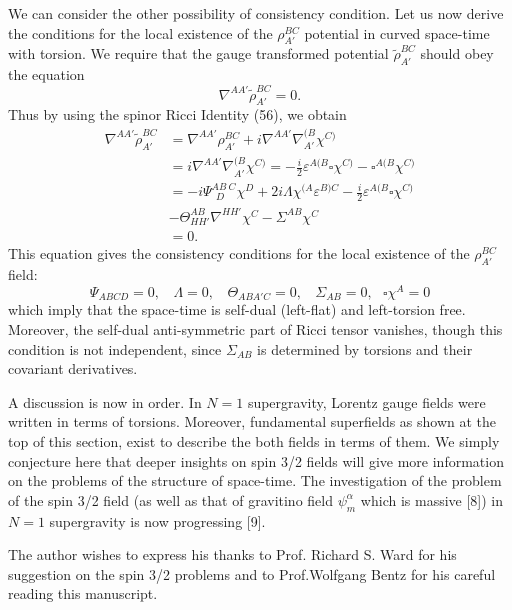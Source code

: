 \documentclass[a4paper,12pt]{article}
\begin{document}
We can consider the other possibility of consistency condition.
Let us now derive the conditions for the local existence of the $\rho_{A'}^{BC}$ potential in curved space-time with torsion. We require that the gauge transformed potential $\tilde\rho_{A'}^{BC}$ should obey the equation
\begin{equation}
\nabla^{AA'}\tilde\rho_{A'}^{BC}=0.
\end{equation}
Thus by using the spinor Ricci Identity (56), we obtain
\begin{equation}
\begin{split}
\nabla^{AA'}\tilde\rho_{A'}^{BC}&=\nabla^{AA'}\rho^{BC}_{A'}+i\nabla^{AA'}\nabla^{(B}_{A'}\chi^{C)}\\
&=i\nabla^{AA'}\nabla^{(B}_{A'}\chi^{C)}=-\frac{i}{2}\varepsilon^{A(B}\square\chi^{C)}-\square^{A(B}\chi^{C)}\\
&=-i\Psi^{AB\ C}_{\ \ D}\chi^D+2i\Lambda\chi^{(A}\varepsilon^{B)C}-\frac{i}{2}\varepsilon^{A(B}\square\chi^{C)}\\
&-\Theta^{AB}_{HH'}\nabla^{HH'}\chi^C-\Sigma^{AB}\chi^C\\
&=0.
\end{split}
\end{equation}
This equation gives the consistency conditions for the local existence of the $\rho_{A'}^{BC}$ field:
\begin{equation}
\Psi_{ABCD}=0,\ \ \ \ \Lambda=0,\ \ \ \ \Theta_{ABA'C}=0,\ \ \ \ \Sigma_{AB}=0,\ \ \ \square\chi^{A}=0
\end{equation}
which imply that the space-time is self-dual (left-flat) and left-torsion free. Moreover, the self-dual anti-symmetric part of Ricci tensor vanishes, though this condition is not independent, since $\Sigma_{AB}$ is determined by torsions and 
their covariant derivatives.

A discussion is now in order. In $N=1$ supergravity, Lorentz gauge fields were written in terms of torsions. Moreover, fundamental superfields as shown at the top of this section, exist to describe the both fields in terms of them.
We simply conjecture here that deeper insights on spin 3/2 fields will give more information on the problems of the structure of space-time. The investigation of the problem of the spin 3/2 field (as well as that of gravitino field $\psi^\alpha_m$ which is massive [8]) in $N=1$ supergravity is now progressing [9].

 The author wishes to express his thanks to Prof. Richard S. Ward for his suggestion on the spin 3/2 problems and to Prof.Wolfgang Bentz for his careful reading this manuscript. 
 
\end{document}
